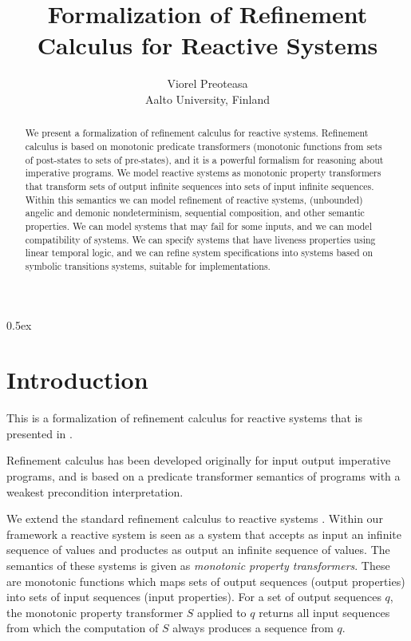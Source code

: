 \documentclass[11pt,a4paper]{article}
\begin{document}
\title{Formalization of Refinement Calculus for Reactive Systems}

\author{Viorel Preoteasa\\
Aalto University, Finland}

\maketitle

\begin{abstract}
We present a formalization of refinement calculus for reactive systems.
Refinement calculus is based on monotonic predicate transformers 
(monotonic functions from sets of post-states to sets of pre-states), 
and it is a powerful formalism for reasoning about imperative programs.
We model reactive systems as monotonic property transformers
that transform sets of output infinite sequences into sets of input
infinite sequences. Within this semantics we can model 
refinement of reactive systems, (unbounded) angelic and
demonic nondeterminism, sequential composition, and 
other semantic properties. We can model systems that may
fail for some inputs, and we can model compatibility of systems.
We can specify systems that have liveness properties using
linear temporal logic, and we can refine system specifications
into systems based on symbolic transitions systems, suitable
for implementations.

\end{abstract}

\tableofcontents

\parindent 0pt\parskip 0.5ex

\section{Introduction}

This is a formalization of refinement calculus for reactive 
systems that is presented in \cite{preoteasa:tripakis:2014tr}.

Refinement calculus \cite{back-1978,back-wright-98} has been
developed originally for input output imperative programs, and
is based on a predicate transformer semantics of programs with 
a weakest precondition interpretation.

We extend the standard refinement calculus to reactive systems
\cite{Harel:1989:DRS:101969.101990}. Within our framework a
reactive system is seen as a system that accepts as input
an infinite sequence of values and productes as output 
an infinite sequence of values. The semantics of these 
systems is given as {\em monotonic property transformers}.
These are monotonic functions which maps sets of output 
sequences (output properties) into sets of input sequences
(input properties). For a set of output sequences $q$, the
monotonic property transformer $S$ applied to $q$ returns
all input sequences from which the computation of $S$ 
always produces a sequence from $q$. 
\end{document}
